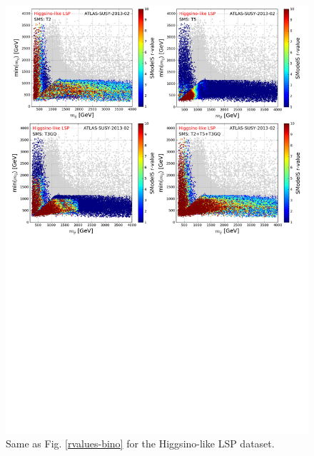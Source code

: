 \documentclass[epj,nopacs,fleqn]{svjour}
\begin{document}
\begin{figure}[!]
\begin{center}
\includegraphics[width=1\textwidth]{PLOTS/App/Higgsino_Combo.pdf}
\end{center}
\caption{Same as Fig. \ref{rvalues-bino} for the Higgsino-like LSP dataset.} 
\label{rvalues-higgsino}
\end{figure}
\end{document}
